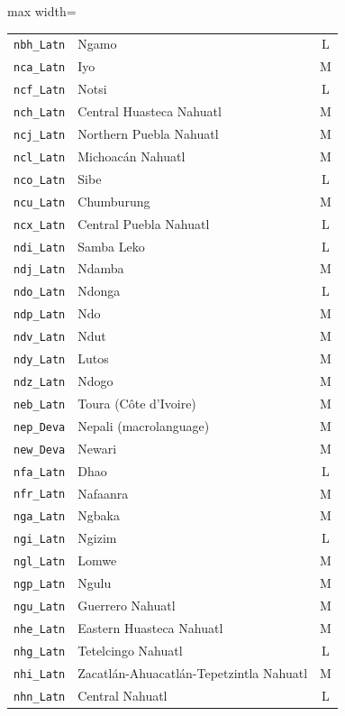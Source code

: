 {\begin{adjustbox}{max width=\textwidth}
\begin{tabular}{llc}
        \texttt{nbh\_Latn} & Ngamo & L \\
        \texttt{nca\_Latn} & Iyo & M \\
        \texttt{ncf\_Latn} & Notsi & L \\
        \texttt{nch\_Latn} & Central Huasteca Nahuatl & M \\
        \texttt{ncj\_Latn} & Northern Puebla Nahuatl & M \\
        \texttt{ncl\_Latn} & Michoacán Nahuatl & M \\
        \texttt{nco\_Latn} & Sibe & L \\
        \texttt{ncu\_Latn} & Chumburung & M \\
        \texttt{ncx\_Latn} & Central Puebla Nahuatl & L \\
        \texttt{ndi\_Latn} & Samba Leko & L \\
        \texttt{ndj\_Latn} & Ndamba & M \\
        \texttt{ndo\_Latn} & Ndonga & L \\
        \texttt{ndp\_Latn} & Ndo & M \\
        \texttt{ndv\_Latn} & Ndut & M \\
        \texttt{ndy\_Latn} & Lutos & M \\
        \texttt{ndz\_Latn} & Ndogo & M \\
        \texttt{neb\_Latn} & Toura (Côte d'Ivoire) & M \\
        \texttt{nep\_Deva} & Nepali (macrolanguage) & M \\
        \texttt{new\_Deva} & Newari & M \\
        \texttt{nfa\_Latn} & Dhao & L \\
        \texttt{nfr\_Latn} & Nafaanra & M \\
        \texttt{nga\_Latn} & Ngbaka & M \\
        \texttt{ngi\_Latn} & Ngizim & L \\
        \texttt{ngl\_Latn} & Lomwe & M \\
        \texttt{ngp\_Latn} & Ngulu & M \\
        \texttt{ngu\_Latn} & Guerrero Nahuatl & M \\
        \texttt{nhe\_Latn} & Eastern Huasteca Nahuatl & M \\
        \texttt{nhg\_Latn} & Tetelcingo Nahuatl & L \\
        \texttt{nhi\_Latn} & Zacatlán-Ahuacatlán-Tepetzintla Nahuatl & M \\
        \texttt{nhn\_Latn} & Central Nahuatl & L \\

\end{tabular}
\end{adjustbox}}
